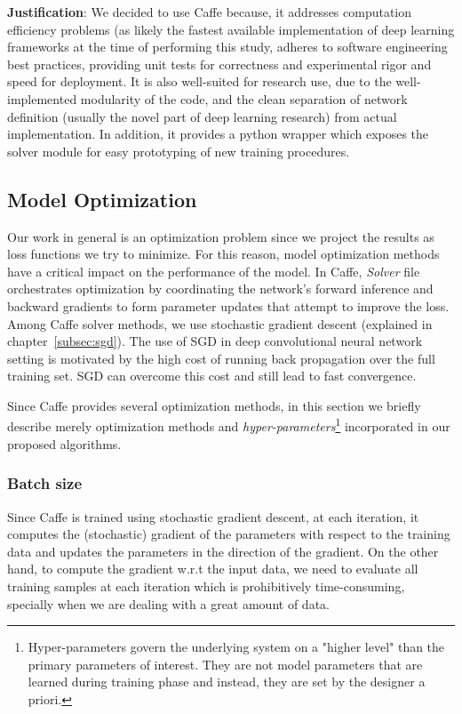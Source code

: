 \textbf{Justification}: We decided to use Caffe because, it addresses computation efficiency problems (as likely the fastest available implementation of deep learning frameworks at the time of performing this study, adheres to software engineering best practices, providing unit tests for correctness and experimental rigor and speed for deployment. It is also well-suited for research use, due to the well-implemented modularity of the code, and the clean separation of network definition (usually the novel part of deep learning research) from actual implementation\cite{jia2014caffe}. In addition, it provides a python wrapper which exposes the solver module for easy prototyping of new training procedures. 

\subsection{Model Optimization}

Our work in general is an optimization problem since we project the results as loss functions we try to minimize. For this reason, model optimization methods have a critical impact on the performance of the model. In Caffe, \textit{Solver} file orchestrates optimization by coordinating the network's forward inference and backward gradients to form parameter updates that attempt to improve the loss. Among Caffe solver methods, we use stochastic gradient descent (explained in chapter~\ref{subsec:sgd}). The use of SGD in deep convolutional neural network setting is motivated by the high cost of running back propagation over the full training set. SGD can overcome this cost and still lead to fast convergence. 

Since Caffe provides several optimization methods, in this section we briefly describe merely optimization methods and \textit{hyper-parameters}\footnote{Hyper-parameters govern the underlying system on a "higher level" than the primary parameters of interest. They are not model parameters that are learned during training phase and instead, they are set by the designer a priori.} incorporated in our proposed algorithms.


\subsubsection{Batch size}

Since Caffe is trained using stochastic gradient descent, at each iteration, it computes the (stochastic) gradient of the parameters with respect to the training data and updates the parameters in the direction of the gradient. On the other hand, to compute the gradient w.r.t the input data, we need to evaluate all training samples at each iteration which is prohibitively time-consuming, specially when we are dealing with a great amount of data. 

